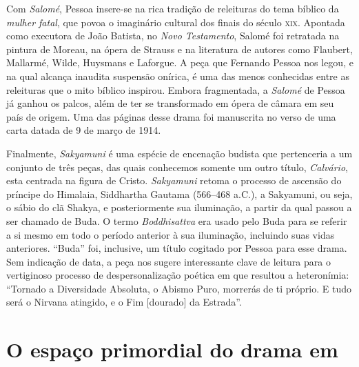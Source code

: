 Com \textit{Salomé}, Pessoa insere-se na rica tradição de releituras do
tema bíblico da \textit{mulher fatal}, que povoa o imaginário cultural
dos finais do século \textsc{xix}. Apontada como executora de João Batista, no
\textit{Novo Testamento}, Salomé foi retratada na pintura de Moreau, na
ópera de Strauss e na literatura de autores como Flaubert, Mallarmé,
Wilde, Huysmans e Laforgue. A peça que Fernando Pessoa nos legou, e na
qual alcança inaudita suspensão onírica, é uma das menos conhecidas
entre as releituras que o mito bíblico inspirou. Embora fragmentada, a
\textit{Salomé} de Pessoa já ganhou os palcos, além de ter se
transformado em ópera de câmara em seu país de
origem. Uma das páginas desse drama foi manuscrita no verso de uma carta
datada de 9 de março de 1914.

Finalmente, \textit{Sakyamuni} é uma
espécie de encenação budista que pertenceria a um conjunto de três
peças, das quais conhecemos somente um outro título, \textit{Calvário},
esta centrada na figura de Cristo. \textit{Sakyamuni} retoma o processo
de ascensão do príncipe do Himalaia, Siddhartha Gautama (566--468 a.C.),
a Sakyamuni, ou seja, o sábio do clã Shakya, e posteriormente sua
iluminação, a partir da qual passou a ser chamado de Buda. O termo
\textit{Boddhisattva} era usado pelo Buda para se referir a si mesmo em
todo o período anterior à sua iluminação, incluindo suas vidas
anteriores. “Buda” foi, inclusive, um título cogitado por Pessoa para
esse drama. Sem indicação de data, a peça nos sugere interessante clave de leitura para o
vertiginoso processo de despersonalização poética em que resultou a
heteronímia: “Tornado a Diversidade Absoluta, o Abismo Puro, morrerás
de ti próprio. E tudo será o Nirvana atingido, e o Fim [dourado] da
Estrada''.


\section{O espaço primordial do drama em }

